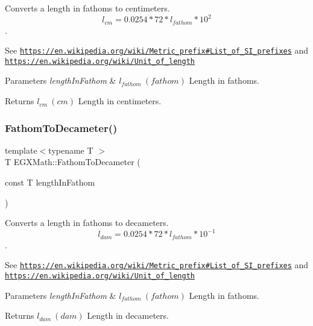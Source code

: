 Converts a length in fathoms to centimeters. \[ l_{cm}=0.0254 * 72 * l_{fathom} * 10^{2} \]. 

See \href{https://en.wikipedia.org/wiki/Metric_prefix#List_of_SI_prefixes}{\tt https\+://en.\+wikipedia.\+org/wiki/\+Metric\+\_\+prefix\#\+List\+\_\+of\+\_\+\+S\+I\+\_\+prefixes} and \href{https://en.wikipedia.org/wiki/Unit_of_length}{\tt https\+://en.\+wikipedia.\+org/wiki/\+Unit\+\_\+of\+\_\+length} 
\begin{DoxyParams}{Parameters}
{\em length\+In\+Fathom} & $ l_{fathom}\ (fathom)$ Length in fathoms. \\
\hline
\end{DoxyParams}
\begin{DoxyReturn}{Returns}
$ l_{cm}\ (cm)$ Length in centimeters. 
\end{DoxyReturn}
\mbox{\label{group___e_g_x_math-_conversions-_length_conversions-_nautical-_fathom-_s_i_ga58364998b467b74922de64f4e2f92825}} 
\subsubsection{\texorpdfstring{Fathom\+To\+Decameter()}{FathomToDecameter()}}
{\footnotesize\ttfamily template$<$typename T $>$ \\
T E\+G\+X\+Math\+::\+Fathom\+To\+Decameter (\begin{DoxyParamCaption}\item[{const T}]{length\+In\+Fathom }\end{DoxyParamCaption})}



Converts a length in fathoms to decameters. \[ l_{dam}=0.0254 * 72 * l_{fathom} * 10^{-1} \]. 

See \href{https://en.wikipedia.org/wiki/Metric_prefix#List_of_SI_prefixes}{\tt https\+://en.\+wikipedia.\+org/wiki/\+Metric\+\_\+prefix\#\+List\+\_\+of\+\_\+\+S\+I\+\_\+prefixes} and \href{https://en.wikipedia.org/wiki/Unit_of_length}{\tt https\+://en.\+wikipedia.\+org/wiki/\+Unit\+\_\+of\+\_\+length} 
\begin{DoxyParams}{Parameters}
{\em length\+In\+Fathom} & $ l_{fathom}\ (fathom)$ Length in fathoms. \\
\hline
\end{DoxyParams}
\begin{DoxyReturn}{Returns}
$ l_{dam}\ (dam)$ Length in decameters. 
\end{DoxyReturn}
\mbox{\label{group___e_g_x_math-_conversions-_length_conversions-_nautical-_fathom-_s_i_gaceb060a2b2455c407eacabd842fa4b59}} 
